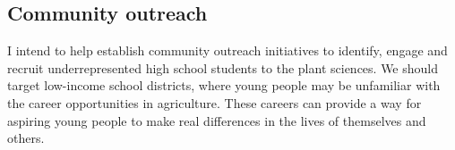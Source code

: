 \documentclass[11pt]{article}
\begin{document}














\subsection*{Community outreach}

I intend to help establish community outreach initiatives to identify, engage and recruit underrepresented high school students to the plant sciences. We should target low-income school districts, where young people may be unfamiliar with the career opportunities in agriculture. These careers can provide a way for aspiring young people to make real differences in the lives of themselves and others. %
\end{document}
